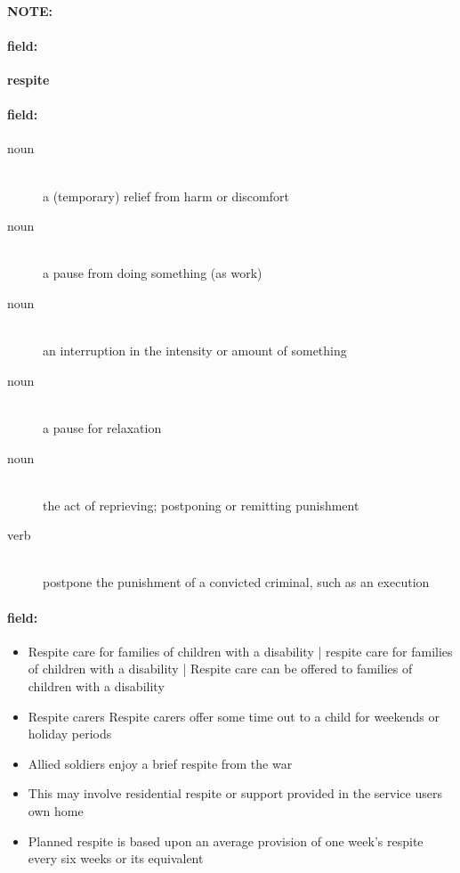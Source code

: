 \documentclass[12pt]{article}
\newenvironment{note}{\paragraph{NOTE:}}{}
\newenvironment{field}{\paragraph{field:}}{}
\begin{document}
\begin{note}
\begin{field}
\textbf{\large respite}
\end{field}


\begin{field}
\begin{description}
\item[noun] \hfill \\ 
a (temporary) relief from harm or discomfort

\item[noun] \hfill \\ 
a pause from doing something (as work)

\item[noun] \hfill \\ 
an interruption in the intensity or amount of something

\item[noun] \hfill \\ 
a pause for relaxation

\item[noun] \hfill \\ 
the act of reprieving; postponing or remitting punishment

\item[verb] \hfill \\ 
postpone the punishment of a convicted criminal, such as an execution

\end{description}
\end{field}

\begin{field}
\begin{itemize}
\item Respite care for families of children with a disability | respite care for families of children with a disability | Respite care can be offered to families of children with a disability
\item Respite carers Respite carers offer some time out to a child for weekends or holiday periods
\item Allied soldiers enjoy a brief respite from the war
\item This may involve residential respite or support provided in the service users own home
\item Planned respite is based upon an average provision of one week's respite every six weeks or its equivalent
\end{itemize}
\end{field}
\end{note}
\end{document}
